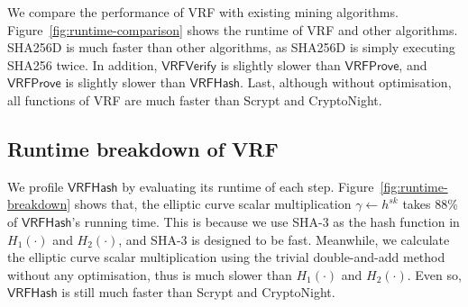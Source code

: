 We compare the performance of VRF with existing mining algorithms.
Figure~\ref{fig:runtime-comparison} shows the runtime of VRF and other algorithms.
SHA256D is much faster than other algorithms, as SHA256D is simply executing SHA256 twice.
In addition, $\mathsf{VRFVerify}$ is slightly slower than $\mathsf{VRFProve}$, and $\mathsf{VRFProve}$ is slightly slower than $\mathsf{VRFHash}$.
Last, although without optimisation, all functions of VRF are much faster than Scrypt and CryptoNight.

\subsection{Runtime breakdown of VRF}

We profile $\mathsf{VRFHash}$ by evaluating its runtime of each step.
Figure~\ref{fig:runtime-breakdown} shows that, the elliptic curve scalar multiplication $\gamma \gets h^{sk}$ takes 88\% of $\mathsf{VRFHash}$'s running time.
This is because we use SHA-3 as the hash function in $H_1(\cdot)$ and $H_2(\cdot)$, and SHA-3 is designed to be fast.
Meanwhile, we calculate the elliptic curve scalar multiplication using the trivial double-and-add method without any optimisation, thus is much slower than $H_1(\cdot)$ and $H_2(\cdot)$.
Even so, $\mathsf{VRFHash}$ is still much faster than Scrypt and CryptoNight.